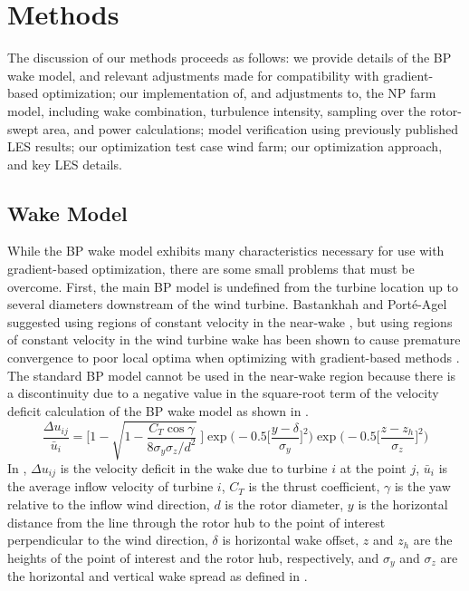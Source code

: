 \documentclass[conf]{new-aiaa}
\begin{document}
\section{Methods}
The discussion of our methods proceeds as follows: we provide details of the BP wake model, and relevant adjustments made for compatibility with gradient-based optimization; our implementation of, and adjustments to, the NP farm model, including wake combination, turbulence intensity, sampling over the rotor-swept area, and power calculations; model verification using previously published LES results; our optimization test case wind farm; our optimization approach, and key LES details.

\subsection{Wake Model}
While the BP wake model exhibits many characteristics necessary for use with gradient-based optimization, there are some small problems that must be overcome. First, the main BP model is undefined from the turbine location up to several diameters downstream of the wind turbine. Bastankhah and Port\'{e}-Agel suggested using regions of constant velocity in the near-wake \cite{bastankhah2016}, but using regions of constant velocity in the wind turbine wake has been shown to cause premature convergence to poor local optima when optimizing with gradient-based methods \cite{thomas2017}. The standard BP model cannot be used in the near-wake region because there is a discontinuity due to a negative value in the square-root term of the velocity deficit calculation of the BP wake model as shown in . 
\begin{equation}\label{eq:bp-vel}
	\frac{\Delta u_{ij}}{\bar{u}_{i}} = \Bigg[1-\sqrt{1-\frac{C_{T} \cos{\gamma}}{8 \sigma_y \sigma_z/d^2}}~\Bigg] \exp{\bigg(-0.5\bigg[\frac{y-\delta}{\sigma_y}\bigg]^2\bigg)}\exp{\bigg(-0.5\bigg[\frac{z-z_h}{\sigma_z}\bigg]^2\bigg)}
\end{equation}
%
In , $\Delta u_{ij}$ is the velocity deficit in the wake due to turbine $i$ at the point $j$, $\bar{u}_{i}$ is the average inflow velocity of turbine $i$, $C_T$ is the thrust coefficient, $\gamma$ is the yaw relative to the inflow wind direction, $d$ is the rotor diameter, $y$ is the horizontal distance from the line through the rotor hub to the point of interest perpendicular to the wind direction, $\delta$ is horizontal wake offset, $z$ and $z_h$ are the heights of the point of interest and the rotor hub, respectively, and $\sigma_y$ and $\sigma_z$ are the horizontal and vertical wake spread as defined in .
\end{document}
